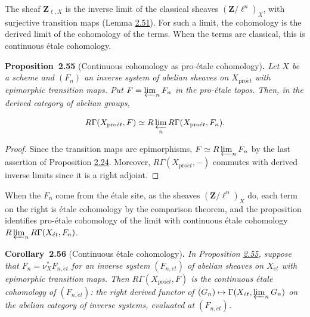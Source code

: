 \documentclass[11pt]{article}
\newenvironment{bpstatement}[2]{\par\addvspace{0.6\baselineskip}\noindent\textbf{#1}#2\textbf{.}\enspace\ignorespaces}
  {\par\addvspace{0.4\baselineskip}}
\newenvironment{bpstatementit}[2]{\begin{bpstatement}{#1}{#2}\itshape\ignorespaces}{\end{bpstatement}}
\begin{document}
The sheaf \(\mathbf Z_{\ell,X}\) is the inverse limit of the classical sheaves \((\mathbf Z/\ell^n)_X\), with surjective transition maps (Lemma \hyperref[bp156]{2.51}). For such a limit, the cohomology is the derived limit of the cohomology of the terms. When the terms are classical, this is continuous étale cohomology.

\label{bp170}%
\begin{bpstatementit}{Proposition~2.55}{ (Continuous cohomology as pro-étale cohomology)}
Let \(X\) be a scheme and \((F_n)\) an inverse system of abelian sheaves on \(X_{\mathrm{pro}\acute{e}t}\) with epimorphic transition maps. Put \(F=\varprojlim_nF_n\) in the pro-étale topos. Then, in the derived category of abelian groups,

\[
R\Gamma(X_{\mathrm{pro}\acute{e}t},F)
\simeq R\varprojlim_n R\Gamma(X_{\mathrm{pro}\acute{e}t},F_n).
\]
\end{bpstatementit}

\begin{proof}[{Proof}]\label{bp171}%
Since the transition maps are epimorphisms, \(F\simeq R\varprojlim_nF_n\) by the last assertion of Proposition \hyperref[bp69]{2.24}. Moreover, \(R\Gamma(X_{\mathrm{pro}\acute{e}t},-)\) commutes with derived inverse limits since it is a right adjoint.
\end{proof}

\label{bp172}%
When the \(F_n\) come from the étale site, as the sheaves \((\mathbf Z/\ell^n)_X\) do, each term on the right is étale cohomology by the comparison theorem, and the proposition identifies pro-étale cohomology of the limit with continuous étale cohomology \(R\varprojlim_nR\Gamma(X_{\acute{e}t},F_n)\).

\label{bp173}%
\begin{bpstatementit}{Corollary~2.56}{ (Continuous étale cohomology)}
In Proposition \hyperref[bp170]{2.55}, suppose that \(F_n=\nu_X^*F_{n,\acute{e}t}\) for an inverse system \((F_{n,\acute{e}t})\) of abelian sheaves on \(X_{\acute{e}t}\) with epimorphic transition maps. Then \(R\Gamma(X_{\mathrm{pro}\acute{e}t},F)\) is the continuous étale cohomology of \((F_{n,\acute{e}t})\): the right derived functor of \((G_n)\mapsto\Gamma(X_{\acute{e}t},\varprojlim_nG_n)\) on the abelian category of inverse systems, evaluated at \((F_{n,\acute{e}t})\).
\end{bpstatementit}
\end{document}
